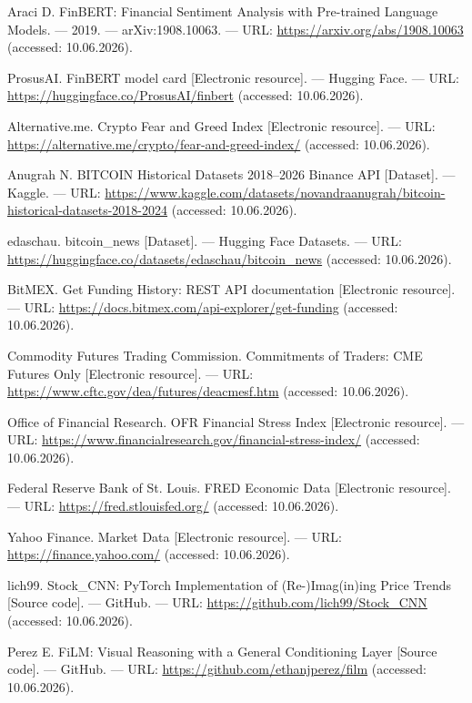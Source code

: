 \documentclass[14pt,a4paper]{extarticle}
\begin{document}
\begin{enumerate}[label={[\arabic*]},leftmargin=1.1cm,itemsep=0.35em]
\item Araci D. FinBERT: Financial Sentiment Analysis with Pre-trained Language Models. --- 2019. --- arXiv:1908.10063. --- URL: \url{https://arxiv.org/abs/1908.10063} (accessed: 10.06.2026).

\item ProsusAI. FinBERT model card [Electronic resource]. --- Hugging Face. --- URL: \url{https://huggingface.co/ProsusAI/finbert} (accessed: 10.06.2026).

\item Alternative.me. Crypto Fear and Greed Index [Electronic resource]. --- URL: \url{https://alternative.me/crypto/fear-and-greed-index/} (accessed: 10.06.2026).

\item Anugrah N. BITCOIN Historical Datasets 2018--2026 Binance API [Dataset]. --- Kaggle. --- URL: \url{https://www.kaggle.com/datasets/novandraanugrah/bitcoin-historical-datasets-2018-2024} (accessed: 10.06.2026).

\item edaschau. bitcoin\_news [Dataset]. --- Hugging Face Datasets. --- URL: \url{https://huggingface.co/datasets/edaschau/bitcoin_news} (accessed: 10.06.2026).

\item BitMEX. Get Funding History: REST API documentation [Electronic resource]. --- URL: \url{https://docs.bitmex.com/api-explorer/get-funding} (accessed: 10.06.2026).

\item Commodity Futures Trading Commission. Commitments of Traders: CME Futures Only [Electronic resource]. --- URL: \url{https://www.cftc.gov/dea/futures/deacmesf.htm} (accessed: 10.06.2026).

\item Office of Financial Research. OFR Financial Stress Index [Electronic resource]. --- URL: \url{https://www.financialresearch.gov/financial-stress-index/} (accessed: 10.06.2026).

\item Federal Reserve Bank of St. Louis. FRED Economic Data [Electronic resource]. --- URL: \url{https://fred.stlouisfed.org/} (accessed: 10.06.2026).

\item Yahoo Finance. Market Data [Electronic resource]. --- URL: \url{https://finance.yahoo.com/} (accessed: 10.06.2026).

\item lich99. Stock\_CNN: PyTorch Implementation of (Re-)Imag(in)ing Price Trends [Source code]. --- GitHub. --- URL: \url{https://github.com/lich99/Stock_CNN} (accessed: 10.06.2026).

\item Perez E. FiLM: Visual Reasoning with a General Conditioning Layer [Source code]. --- GitHub. --- URL: \url{https://github.com/ethanjperez/film} (accessed: 10.06.2026).
\end{enumerate}
\endgroup
\end{document}
